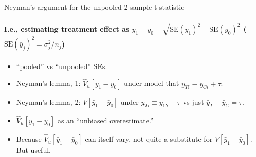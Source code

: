 
\begin{frame}{Neyman's argument for the unpooled 2-sample t-statistic} \pause
 \framesubtitle{I.e., estimating treatment effect as %
$\bar{y}_{1} - \bar{y}_0   \pm \sqrt{\mathrm{SE}(\bar{y}_{1})^{2} +
  \mathrm{SE}(\bar{y}_{0}) ^{2}}$ ($\mathrm{SE}(\bar{y}_{j})^{2} = \sigma_{j}^{2}/n_{j} $) }

\begin{itemize}[<+->]
\item ``pooled'' vs ``unpooled'' SEs. 
\item Neyman's lemma, 1: $\hat{V}_{u}[ \bar{y}_{1} - \bar{y}_0  ]$ under model that $y_{Ti} \equiv
  y_{Ci} +\tau$.
\item Neyman's lemma, 2: $V[\bar{y}_{1} - \bar{y}_0 ]$ under $y_{Ti} \equiv
  y_{Ci} +\tau$ vs just  $\bar{y}_{T} - \bar{y}_{C} =\tau$. 
\item $\hat{V}_{u}[ \bar{y}_{1} - \bar{y}_0  ]$ as an ``unbiased
  overestimate.''
\item Because $\hat{V}_{u}[ \bar{y}_{1} - \bar{y}_0  ]$ can itself
  vary, not quite a substitute for ${V}[ \bar{y}_{1} - \bar{y}_0  ]$.
  But useful.
\end{itemize}


\end{frame}

